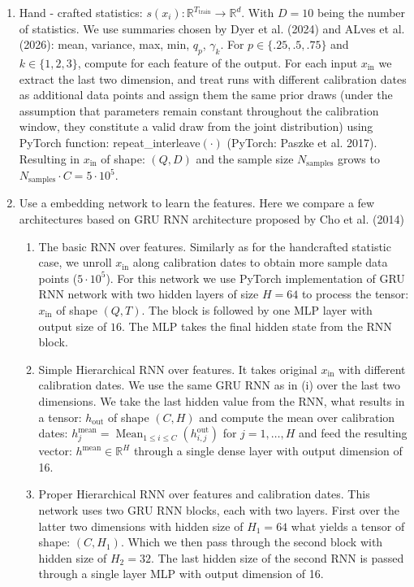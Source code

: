 \documentclass[12pt]{article}
\begin{document}
\begin{enumerate}
    \item [a. ] Hand - crafted statistics: $s(x_i) : \mathbb{R}^{T_\text{train}}\to \mathbb{R}^d$. With $D = 10$ being the number of statistics. We use  summaries chosen by Dyer et al. (2024) and ALves et al. (2026): mean, variance, max, min, $q_p$, $\gamma_k$. For $p \in \{ .25, .5, .75 \}$ and $k \in \{ 1, 2, 3 \}$, compute for each feature of the output. For each input $x_\text{in}$ we extract the last two dimension, and treat runs with different calibration dates as additional data points and assign them the same prior draws (under the assumption that parameters remain constant throughout the calibration window, they constitute a valid draw from the joint distribution) using PyTorch function: repeat\_interleave$(\cdot)$ (PyTorch: Paszke et al. 2017). Resulting in $x_\text{in}$ of shape: $(Q, D)$ and the sample size $N_\text{samples}$ grows to $N_\text{samples}  \cdot C = 5 \cdot 10^5$.
 
    \item [b. ] Use a embedding network to learn the features. Here we compare a few architectures based on GRU RNN architecture proposed by Cho et al. (2014)
    \begin{enumerate}

        \item [i. ] The basic RNN over features. Similarly as for the handcrafted statistic case, we unroll $x_\text{in}$ along calibration dates to obtain more sample data points ($5 \cdot 10^5$). For this network we use PyTorch implementation of GRU RNN network with two hidden layers of size $H = 64$ to process the tensor: $x_\text{in}$ of shape $(Q, T)$. The block is followed by one MLP layer with output size of $16$. The MLP takes the final hidden state from the RNN block.
        
        \item [ii. ] Simple Hierarchical RNN over features. It takes original $x_\text{in}$ with different calibration dates. We use the same GRU RNN as in (i) over the last two dimensions. We take the last hidden value from the RNN, what results in a tensor: $h_\text{out}$ of shape $(C, H)$ and compute the mean over calibration dates: $h^\text{mean}_j = \operatorname{Mean}_{1 \leq i \leq C}\left( h^\text{out}_{i, j} \right)$ for $j = 1, \dots, H$ and feed the resulting vector: $h^\text{mean} \in \mathbb{R}^H$ through a single dense layer with output dimension of 16. 
        
        \item [iii.] Proper Hierarchical RNN over features and calibration dates. This network uses two GRU RNN blocks, each with two layers. First over the latter two dimensions with hidden size of $H_1 = 64$ what yields a tensor of shape: $(C, H_1)$. Which we then pass through the second block with hidden size of $H_2 = 32$. The last hidden size of the second RNN is passed through a single layer MLP with output dimension of 16. 
    \end{enumerate}
    
\end{enumerate}
\end{document}
